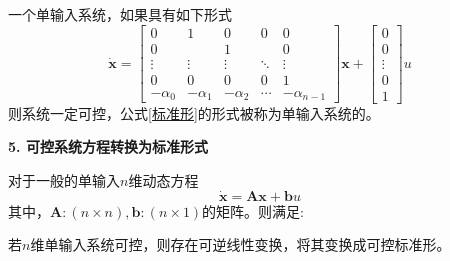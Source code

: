 一个单输入系统，如果具有如下形式
\begin{equation}
	\dot{\bm{x}} = 
	\begin{bmatrix}
		0 & 1 & 0 & 0 & 0 \\
		0 &   & 1 &   & 0\\
		\vdots & \vdots & \vdots & \ddots & \vdots\\
		0 & 0 & 0 & 0 & 1\\
		-\alpha_0 & -\alpha_1 & -\alpha_2 & \cdots & - \alpha_{n-1} 
	\end{bmatrix}
	\bm{x} +
	\begin{bmatrix}
		0\\
		0\\
		\vdots\\
		0\\
		1
	\end{bmatrix}
	u
	\label{标准形}
\end{equation}
则系统一定可控，公式\eqref{标准形}的形式被称为单输入系统的。
\vspace*{1em}

\noindent \textbf{5. 可控系统方程转换为标准形式}	

对于一般的单输入$n$维动态方程
\begin{equation}
	\dot{\bm{x}} = \bm{Ax} + \bm{b}u
\end{equation}
其中，$\bm{A}:(n \times n), \bm{b}: (n \times 1)$的矩阵。则满足:

若$n$维单输入系统可控，则存在可逆线性变换，将其变换成可控标准形。
\vspace*{0.5em}

